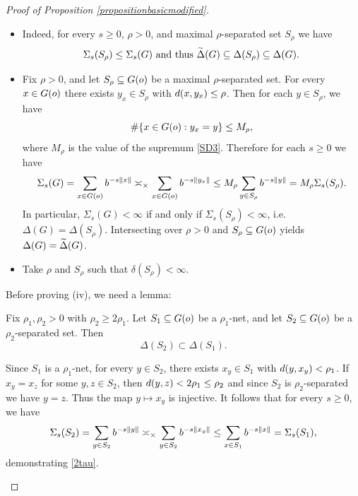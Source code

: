 \begin{proof}[Proof of Proposition \ref{propositionbasicmodified}]
~
\begin{itemize}
\item[(i)] Indeed, for every $s\geq 0$, $\rho > 0$, and maximal $\rho$-separated set $S_\rho$ we have
\[
\Sigma_s(S_\rho) \leq \Sigma_s(G) \textup{ and thus }\widetilde\Delta(G) \subseteq \Delta(S_\rho) \subseteq \Delta(G).
\]
\item[(ii)] Fix $\rho > 0$, and let $S_\rho\subseteq G(o)$ be a maximal $\rho$-separated set. For every $x\in G(o)$ there exists $y_x\in S_\rho$ with $d(x,y_x) \leq \rho$. Then for each $y\in S_\rho$, we have
\[
\#\{ x\in G(o) : y_x = y \} \leq M_\rho,
\]
where $M_\rho$ is the value of the supremum \eqref{SD3}. Therefore for each $s\geq 0$ we have
\[
\Sigma_s(G)
= \sum_{x\in G(o)} b^{-s \|x\|}
\asymp_\times \sum_{x\in G(o)} b^{-s\|y_x\|}
\leq M_\rho \sum_{y\in S_\rho} b^{-s \|y\|}
= M_\rho\Sigma_s(S_\rho).
\]
In particular, $\Sigma_s(G) < \infty$ if and only if $\Sigma_s(S_\rho) < \infty$, i.e. $\Delta(G) = \Delta(S_\rho)$. Intersecting over $\rho > 0$ and $S_\rho\subseteq G(o)$ yields $\Delta(G) = \widetilde\Delta(G)$.
\item[(iii)] Take $\rho$ and $S_\rho$ such that $\delta(S_\rho) < \infty$.
\end{itemize}

Before proving (iv), we need a lemma:
\begin{lemma}
\label{lemma2tau}
Fix $\rho_1,\rho_2 > 0$ with $\rho_2\geq 2\rho_1$. Let $S_1\subseteq G(o)$ be a $\rho_1$-net, and let $S_2\subseteq G(o)$ be a $\rho_2$-separated set. Then
\begin{equation}
\label{2tau}
\Delta(S_2) \subset \Delta(S_1).
\end{equation}
\end{lemma}
\begin{subproof}
Since $S_1$ is a $\rho_1$-net, for every $y\in S_2$, there exists $x_y\in S_1$ with $d(y,x_y) < \rho_1$. If $x_y = x_z$ for some $y,z\in S_2$, then $d(y,z) < 2\rho_1 \leq \rho_2$ and since $S_2$ is $\rho_2$-separated we have $y = z$. Thus the map $y\mapsto x_y$ is injective. It follows that for every $s\geq 0$, we have
\[
\Sigma_s(S_2)
= \sum_{y\in S_2} b^{-s \|y\|}
\asymp_\times \sum_{y\in S_2} b^{-s \|x_y\|}
\leq \sum_{x\in S_1} b^{-s \|x\|}
= \Sigma_s(S_1),
\]
demonstrating \eqref{2tau}.
\end{subproof}


\end{proof}
